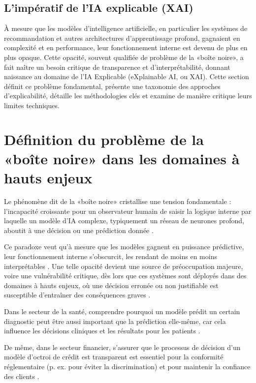 \subsection{L'impératif de l'IA explicable (XAI)}
À mesure que les modèles d'intelligence artificielle, en particulier les systèmes de recommandation et autres architectures d'apprentissage profond, gagnaient en complexité et en performance, leur fonctionnement interne est devenu de plus en plus opaque. Cette opacité, souvent qualifiée de problème de la «boîte noire», a fait naître un besoin critique de transparence et d'interprétabilité, donnant naissance au domaine de l'IA Explicable (eXplainable AI, ou XAI). Cette section définit ce problème fondamental, présente une taxonomie des approches d'explicabilité, détaille les méthodologies clés et examine de manière critique leurs limites techniques.
\section{Définition du problème de la «boîte noire» dans les domaines à hauts enjeux}
Le phénomène dit de la «boîte noire» cristallise une tension fondamentale : l'incapacité croissante pour un observateur humain de saisir la logique interne par laquelle un modèle d'IA complexe, typiquement un réseau de neurones profond, aboutit à une décision ou une prédiction donnée \citep{Sankarapu2024, Zhao2023a}. 

Ce paradoxe veut qu'à mesure que les modèles gagnent en puissance prédictive, leur fonctionnement interne s'obscurcit, les rendant de moins en moins interprétables \citep{Sankarapu2024}. Une telle opacité devient une source de préoccupation majeure, voire une vulnérabilité critique, dès lors que ces systèmes sont déployés dans des domaines à hauts enjeux, où une décision erronée ou non justifiable est susceptible d'entraîner des conséquences graves \citep{Sankarapu2024, Meske2022}.

Dans le secteur de la santé, comprendre pourquoi un modèle prédit un certain diagnostic peut être aussi important que la prédiction elle-même, car cela influence les décisions cliniques et les résultats pour les patients \citep{Sankarapu2024}. 

De même, dans le secteur financier, s'assurer que le processus de décision d'un modèle d'octroi de crédit est transparent est essentiel pour la conformité réglementaire (p. ex. pour éviter la discrimination) et pour maintenir la confiance des clients \citep{Sankarapu2024, Grynbaum2023}.

